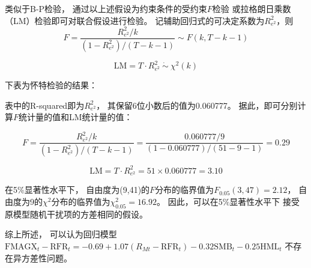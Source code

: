 \documentclass[UTF8]{ctexart}
\begin{document}
类似于B-P检验，
通过以上述假设为约束条件的受约束$F$检验
或拉格朗日乘数（LM）检验即可对联合假设进行检验。
记辅助回归式的可决定系数为$R_{e^2}^2$，则
\begin{equation}
  F=\frac{R_{e^{2}}^{2} / k}{\left(1-R_{e^{2}}^{2}\right) /(T-k-1)} \sim F(k,T-k-1)
\end{equation}

\begin{equation}
  \mathrm{LM}=T \cdot R_{e^{2}}^{2}\ \dot \sim\ \chi^{2}(k)
\end{equation}

下表为怀特检验的结果：


表中的R-squared即为$R_{e^2}^{2}$，
其保留6位小数后的值为0.060777。
据此，即可分别计算$F$统计量的值和$\mathrm{LM}$统计量的值：




\begin{equation}
  F=\frac{R_{e^2}^{2}/k}{\left( 1-R_{e^2}^{2} \right) /(T-k-1)}=\frac{0.060777/9}{\left( 1-0.060777 \right) /\left( 51-9-1 \right)}=0.29
\end{equation}

\begin{equation}
  \mathrm{LM}=T \cdot R_{e^{2}}^{2} = 51\times 0.060777 = 3.10
\end{equation}

在5\%显著性水平下，
自由度为(9,41)的$F$分布的临界值为$F_{0.05}(3,47)=2.12$，
自由度为9的$\chi^2$分布的临界值为$\chi^2_{0.05}=16.92$。
因此，可以在5\%显著性水平下
接受原模型随机干扰项的方差相同的假设。

综上所述，
可以认为回归模型
$\text{FMAGX}_t-\mathrm{RFR}_t=-0.69+1.07\left( R_{Mt}-\mathrm{RFR}_t \right) -0.32\mathrm{SMB}_t-0.25\mathrm{HML}_t$
不存在异方差性问题。
\end{document}
